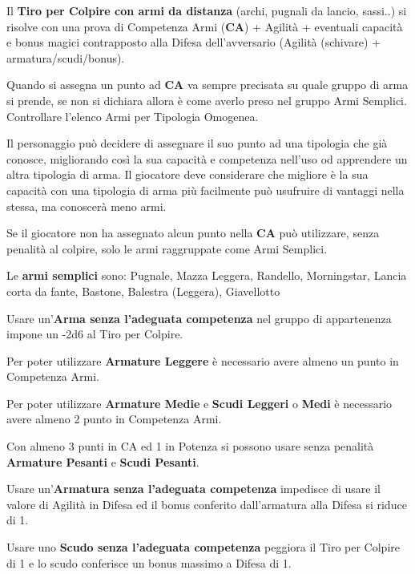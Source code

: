 \documentclass[a4paper,11pt,twoside,openany]{book}
\begin{document}
Il \textbf{Tiro per Colpire con armi da distanza} (archi, pugnali da lancio, sassi..) si risolve con una prova di Competenza Armi (\textbf{CA}) + Agilità + eventuali capacità e bonus magici contrapposto alla Difesa dell'avversario (Agilità (schivare) + armatura/scudi/bonus).

Quando si assegna un punto ad \textbf{CA} va sempre precisata su quale gruppo di arma si prende, se non si dichiara allora è come averlo preso nel gruppo Armi Semplici.
Controllare l'elenco Armi per Tipologia Omogenea.

Il personaggio può decidere di assegnare il suo punto ad una tipologia che già conosce, migliorando così la sua capacità e competenza nell'uso od apprendere un altra tipologia di arma.
Il giocatore deve considerare che migliore è la sua capacità con una tipologia di arma più facilmente può usufruire di vantaggi nella stessa, ma conoscerà meno armi.

Se il giocatore non ha assegnato alcun punto nella \textbf{CA} può utilizzare, senza penalità al colpire, solo le armi raggruppate come Armi Semplici.

Le \textbf{armi semplici} sono: Pugnale, Mazza Leggera, Randello, Morningstar,
Lancia corta da fante, Bastone, Balestra (Leggera), Giavellotto

Usare un'\textbf{Arma senza l'adeguata competenza} nel gruppo di appartenenza impone un -2d6 al Tiro per Colpire.

Per poter utilizzare \textbf{Armature Leggere} è necessario avere almeno un punto in Competenza Armi.

Per poter utilizzare \textbf{Armature Medie} e \textbf{Scudi Leggeri} o \textbf{Medi} è necessario avere almeno 2 punto in Competenza Armi.

Con almeno 3 punti in CA ed 1 in Potenza si possono usare senza penalità \textbf{Armature Pesanti} e \textbf{Scudi Pesanti}.

Usare un'\textbf{Armatura senza l'adeguata competenza} impedisce di usare il valore di Agilità in Difesa ed il bonus conferito dall'armatura alla Difesa si riduce di 1.

Usare uno \textbf{Scudo senza l'adeguata competenza} peggiora il Tiro per Colpire di 1 e lo scudo conferisce un bonus massimo a Difesa di 1.
\end{document}
